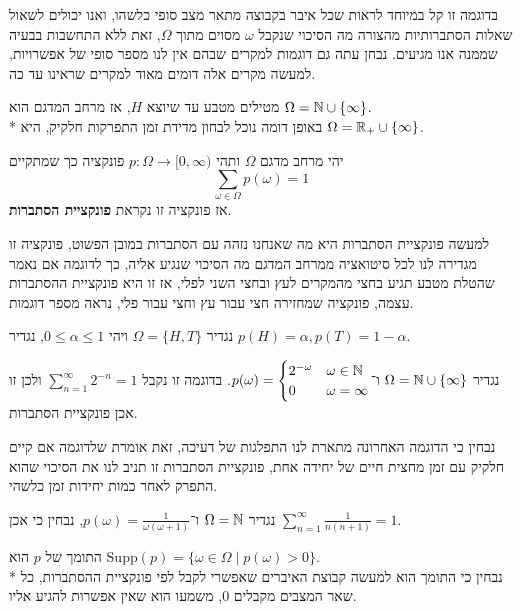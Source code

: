 בדוגמה זו קל במיוחד לראות שכל איבר בקבוצה מתאר מצב סופי כלשהו, ואנו יכולים לשאול שאלות הסתברותיות מהצורה מה הסיכוי שנקבל $\omega$ מסוים מתוך $\Omega$, זאת ללא התחשבות בבעיה שממנה אנו מגיעים.
נבחן עתה גם דוגמות למקרים שבהם אין לנו מספר סופי של אפשרויות, למעשה מקרים אלה דומים מאוד למקרים שראינו עד כה.
\begin{example}
	מטילים מטבע עד שיוצא $H$, אז מרחב המדגם הוא $\Omega = \mathbb{N} \cup \{ \infty \}$. \\*
	באופן דומה נוכל לבחון מדידת זמן התפרקות חלקיק, היא $\Omega = \mathbb{R}_+ \cup \{ \infty \}$.
\end{example}
\begin{definition}
	יהי מרחב מדגם $\Omega$ ותהי $p : \Omega \to [0, \infty)$ פונקציה כך שמתקיים
	\[
		\sum_{\omega \in \Omega} p(\omega) = 1
	\]
	אז פונקציה זו נקראת \textbf{פונקציית הסתברות}.
\end{definition}
למעשה פונקציית הסתברות היא מה שאנחנו נזהה עם הסתברות במובן הפשוט, פונקציה זו מגדירה לנו לכל סיטואציה ממרחב המדגם מה הסיכוי שנגיע אליה, כך לדוגמה אם נאמר שהטלת מטבע תגיע בחצי מהמקרים לעץ ובחצי השני לפלי,
אז זו היא פונקציית ההסתברות עצמה, פונקציה שמחזירה חצי עבור עץ וחצי עבור פלי, נראה מספר דוגמות.
\begin{example}
	נגדיר $\Omega = \{ H, T \}$ ויהי $0 \le \alpha \le 1$, נגדיר $p(H) = \alpha, p(T) = 1 - \alpha$.
\end{example}
\begin{example}
	נגדיר $\Omega = \mathbb{N} \cup \{ \infty \}$ ו־$p(\omega) = \begin{cases}
		2^{-\omega} & \omega \in \mathbb{N} \\
		0 & \omega = \infty
	\end{cases}$.
	בדוגמה זו נקבל $\sum_{n = 1}^{\infty} 2^{-n} = 1$ ולכן זו אכן פונקציית הסתברות.
\end{example}
נבחין כי הדוגמה האחרונה מתארת לנו התפלגות של דעיכה, זאת אומרת שלדוגמה אם קיים חלקיק עם זמן מחצית חיים של יחידה אחת, פונקציית הסתברות זו תניב לנו את הסיכוי שהוא התפרק לאחר כמות יחידות זמן כלשהי.
\begin{example}
	נגדיר $\Omega = \mathbb{N}$ ו־$p(\omega) = \frac{1}{\omega(\omega + 1)}$, נבחין כי אכן $\sum_{n = 1}^{\infty} \frac{1}{n(n + 1)} = 1$.
\end{example}
\begin{definition}[תומך]
	התומך של $p$ הוא $\text{Supp}(p) = \{ \omega \in \Omega \mid p(\omega) > 0 \}$. \\*
	נבחין כי התומך הוא למעשה קבוצת האיברים שאפשרי לקבל לפי פונקציית ההסתברות, כל שאר המצבים מקבלים 0, משמעו הוא שאין אפשרות להגיע אליו.
\end{definition}
